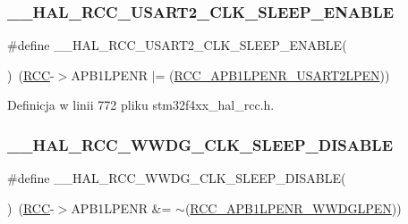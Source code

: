 \subsubsection{\texorpdfstring{\+\_\+\+\_\+\+H\+A\+L\+\_\+\+R\+C\+C\+\_\+\+U\+S\+A\+R\+T2\+\_\+\+C\+L\+K\+\_\+\+S\+L\+E\+E\+P\+\_\+\+E\+N\+A\+B\+LE}{\_\_HAL\_RCC\_USART2\_CLK\_SLEEP\_ENABLE}}
{\footnotesize\ttfamily \#define \+\_\+\+\_\+\+H\+A\+L\+\_\+\+R\+C\+C\+\_\+\+U\+S\+A\+R\+T2\+\_\+\+C\+L\+K\+\_\+\+S\+L\+E\+E\+P\+\_\+\+E\+N\+A\+B\+LE(\begin{DoxyParamCaption}{ }\end{DoxyParamCaption})~(\hyperlink{group___peripheral__declaration_ga74944438a086975793d26ae48d5882d4}{R\+CC}-\/$>$A\+P\+B1\+L\+P\+E\+NR $\vert$= (\hyperlink{group___peripheral___registers___bits___definition_ga6055c39af369463e14d6ff2017043671}{R\+C\+C\+\_\+\+A\+P\+B1\+L\+P\+E\+N\+R\+\_\+\+U\+S\+A\+R\+T2\+L\+P\+EN}))}



Definicja w linii 772 pliku stm32f4xx\+\_\+hal\+\_\+rcc.\+h.

\mbox{\label{group___r_c_c___a_p_b1___low_power___enable___disable_gae61c24ac6b36e7edbabc5b050b38d63e}} 
\subsubsection{\texorpdfstring{\+\_\+\+\_\+\+H\+A\+L\+\_\+\+R\+C\+C\+\_\+\+W\+W\+D\+G\+\_\+\+C\+L\+K\+\_\+\+S\+L\+E\+E\+P\+\_\+\+D\+I\+S\+A\+B\+LE}{\_\_HAL\_RCC\_WWDG\_CLK\_SLEEP\_DISABLE}}
{\footnotesize\ttfamily \#define \+\_\+\+\_\+\+H\+A\+L\+\_\+\+R\+C\+C\+\_\+\+W\+W\+D\+G\+\_\+\+C\+L\+K\+\_\+\+S\+L\+E\+E\+P\+\_\+\+D\+I\+S\+A\+B\+LE(\begin{DoxyParamCaption}{ }\end{DoxyParamCaption})~(\hyperlink{group___peripheral__declaration_ga74944438a086975793d26ae48d5882d4}{R\+CC}-\/$>$A\+P\+B1\+L\+P\+E\+NR \&= $\sim$(\hyperlink{group___peripheral___registers___bits___definition_ga13f3db4ac67bf32c994364cc43f4fe8b}{R\+C\+C\+\_\+\+A\+P\+B1\+L\+P\+E\+N\+R\+\_\+\+W\+W\+D\+G\+L\+P\+EN}))}



